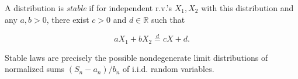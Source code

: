 A distribution is \textit{stable} if for independent r.v.'s $X_1, X_2$ with this distribution and any $a, b > 0$, there exist $c > 0$ and $d \in \mathbb{R}$ such that

$$a X_1 + b X_2 \overset{d}{=} c X + d.$$

Stable laws are precisely the possible nondegenerate limit distributions of normalized sums $(S_n - a_n)/b_n$ of i.i.d. random variables.
